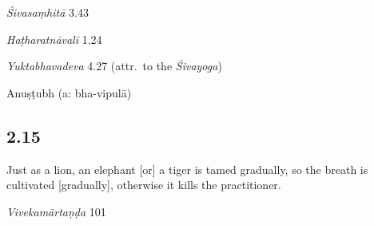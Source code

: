 \begin{ekdosis}
\begin{sources}[hp02_014]
\emph{Śivasaṃhitā} 3.43

\begin{versinnote}
\end{versinnote}
\end{sources}

\begin{testimonia}[hp02_014]
\emph{Haṭharatnāvalī} 1.24

\begin{versinnote}
\end{versinnote}

\emph{Yuktabhavadeva} 4.27 (attr.~to the \emph{Śivayoga})
\begin{versinnote}
\end{versinnote}

\end{testimonia}


\begin{metre}[hp02_014]
Anuṣṭubh (a: bha-vipulā)
\end{metre}

\subsection*{2.15}
\begin{translation}[hp02_015]
Just as a lion, an elephant [or] a tiger is tamed gradually, so the breath is cultivated [gradually], otherwise it kills the practitioner.
\end{translation}

\begin{sources}[hp02_015]
\emph{Vivekamārtaṇḍa} 101

\begin{versinnote}
\end{versinnote}
\end{sources}


\end{ekdosis}
